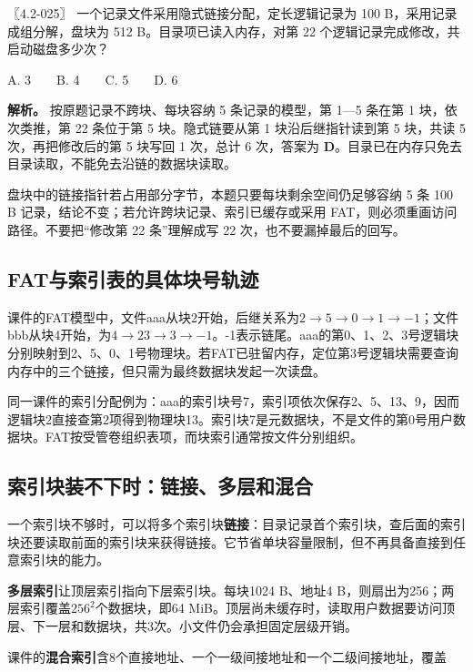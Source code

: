 \begin{example}[配套例题]

〖4.2-025〗 一个记录文件采用隐式链接分配，定长逻辑记录为 100 B，采用记录成组分解，盘块为 512 B。目录项已读入内存，对第 22 个逻辑记录完成修改，共启动磁盘多少次？

A. 3　　B. 4　　C. 5　　D. 6

\end{example}

\textbf{解析。} 按原题记录不跨块、每块容纳 5 条记录的模型，第 1---5 条在第 1 块，依次类推，第 22 条位于第 5 块。隐式链要从第 1 块沿后继指针读到第 5 块，共读 5 次，再把修改后的第 5 块写回 1 次，总计 6 次，答案为 \textbf{D}。目录已在内存只免去目录读取，不能免去沿链的数据块读取。

盘块中的链接指针若占用部分字节，本题只要每块剩余空间仍足够容纳 5 条 100 B 记录，结论不变；若允许跨块记录、索引已缓存或采用 FAT，则必须重画访问路径。不要把``修改第 22 条''理解成写 22 次，也不要漏掉最后的回写。

\subsection{FAT与索引表的具体块号轨迹}\label{OS04-fat-example}

课件的FAT模型中，文件aaa从块2开始，后继关系为\(2\to5\to0\to1\to-1\)；文件bbb从块4开始，为\(4\to23\to3\to-1\)。-1表示链尾。aaa的第0、1、2、3号逻辑块分别映射到2、5、0、1号物理块。若FAT已驻留内存，定位第3号逻辑块需要查询内存中的三个链接，但只需为最终数据块发起一次读盘。

同一课件的索引分配例为：aaa的索引块号7，索引项依次保存2、5、13、9，因而逻辑块2直接查第2项得到物理块13。索引块7是元数据块，不是文件的第0号用户数据块。FAT按受管卷组织表项，而块索引通常按文件分别组织。

\subsection{索引块装不下时：链接、多层和混合}\label{OS04-index-extensions}

一个索引块不够时，可以将多个索引块\textbf{链接}：目录记录首个索引块，查后面的索引块还要读取前面的索引块来获得链接。它节省单块容量限制，但不再具备直接到任意索引块的能力。

\textbf{多层索引}让顶层索引指向下层索引块。每块1024 B、地址4 B，则扇出为256；两层索引覆盖\(256^2\)个数据块，即64 MiB。顶层尚未缓存时，读取用户数据要访问顶层、下一层和数据块，共3次。小文件仍会承担固定层级开销。

课件的\textbf{混合索引}含8个直接地址、一个一级间接地址和一个二级间接地址，覆盖

